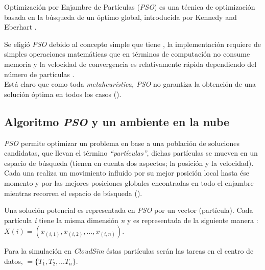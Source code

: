 \documentclass[jou,apacite]{apa6}
\begin{document}
Optimización por Enjambre de Partículas (\textit{PSO}) es una técnica de optimización basada en la búsqueda de un óptimo global, introducida por Kennedy and Eberhart \cite{pandey2010}. 

Se eligió  \textit{PSO} debido al concepto simple que tiene \cite{poli2007},  la implementación requiere de simples operaciones matemáticas que en términos de computación no consume memoria  y la velocidad de convergencia es relativamente rápida dependiendo del número de partículas \cite{eberhart1995}.\\ 
Está claro que como toda \textit{metaheurística, PSO} no garantiza la obtención de una solución óptima en todos los casos (\cite{osman2012}).

\subsection{Algoritmo \textit{PSO} y un ambiente en la nube}
\textit{PSO} permite optimizar un problema en base a una población de soluciones candidatas, que llevan el término \textit{“partículas”}, dichas partículas se mueven en un espacio de búsqueda (tienen en cuenta dos aspectos; la posición y la velocidad). Cada una realiza un movimiento influido por su mejor posición local hasta ése momento y por las mejores posiciones globales encontradas en todo el enjambre mientras recorren el espacio de búsqueda (\cite{poli2007}).

Una solución potencial es representada en \textit{PSO} por un vector (partícula). Cada partícula \textit{i} tiene la misma dimensión \textit{n} y es representada de la siguiente manera \cite{pandey2010}: $X(i) = (x_{(i,1)},x_{(i,2)},...,x_{(i,n)})  $.

Para la simulación en \textit{CloudSim} éstas partículas serán las tareas en el centro de datos, $ = \{T_1 , T_2 , ... T_n\}  $.

\end{document}
